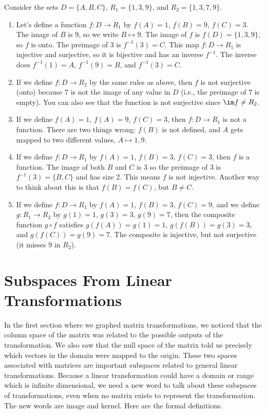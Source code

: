 \begin{example}
Consider the sets $D=\{A,B,C\}$, $R_1=\{1,3,9\}$, and $R_2=\{1,3,7,9\}$.
\begin{enumerate}
	\item Let's define a function $f\colon D\to R_1$ by $f(A)=1$, $f(B)=9$, $f(C)=3$.  The image of $B$ is $9$, so we write $B\mapsto 9$. The image of $f$ is $f(D)=\{1,3,9\}$, so $f$ is onto. The preimage of $3$ is $f^{-1}(3)=C$. This map $f\colon D\to R_1$ is injective and surjective, so it is bijective and has an inverse $f^{-1}$.  The inverse does $f^{-1}(1)=A$, $f^{-1}(9)=B$, and $f^{-1}(3)=C$. 
        \item If we define $f\colon D\to R_2$ by the same rules as above, then $f$ is not surjective (onto) because 7 is not the image of any value in $D$ (i.e., the preimage of $7$ is empty).  You can also see that the function is not surjective since $\im f\neq R_2$.
	\item If we define $f(A)=1$, $f(A)=9$, $f(C)=3$, then $f\colon D\to R_1$ is not a function. There are two things wrong: $f(B)$ is not defined, and $A$ gets mapped to two different values, $A\mapsto 1,9$.
	\item If we define $f\colon D\to R_1$ by $f(A)=1$, $f(B)=3$, $f(C)=3$, then $f$ is a function.  The image of both $B$ and $C$ is $3$ so the preimage of $3$ is $f^{-1}(3)=\{B,C\}$ and has size 2.  This means $f$ is not injective.  Another way to think about this is that $f(B)=f(C)$, but $B\neq C$.
	\item If we define $f\colon D\to R_1$ by $f(A)=1$, $f(B)=3$, $f(C)=9$, and we define $g\colon R_1\to R_2$ by $g(1)=1$, $g(3)=3$, $g(9)=7$, then the composite function $g\circ f$ satisfies $g(f(A))=g(1)=1$, $g(f(B))=g(3)=3$, and $g(f(C))=g(9)=7$. The composite is injective, but not surjective (it misses 9 in $R_2$). 
\end{enumerate}
\end{example}


  
\section{Subspaces From Linear Transformations}

In the first section where we graphed matrix transformations, we noticed that the column space of the matrix was related to the possible outputs of the transformation. We also saw that the null space of the matrix told us precisely which vectors in the domain were mapped to the origin.  These two spaces associated with matrices are important subspaces related to general linear transformations.  Because a linear transformation could have a domain or range which is infinite dimensional, we need a new word to talk about these subspaces of transformations, even when no matrix exists to represent the transformation.  The new words are image and kernel. Here are the formal definitions.

